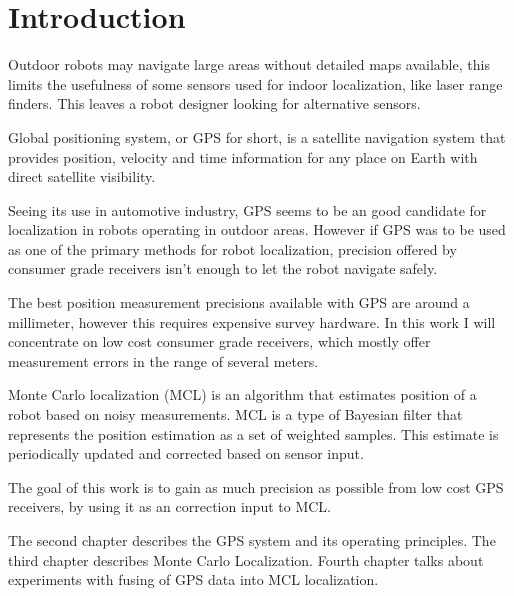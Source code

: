 \chapter{Introduction}


Outdoor robots may navigate large areas without detailed maps available, this limits
the usefulness of some sensors used for indoor localization, like laser range finders.
This leaves a robot designer looking for alternative sensors.




Global positioning system, or GPS for short, is a satellite navigation system that
provides position, velocity and time information for any place on Earth with direct
satellite visibility.

Seeing its use in automotive industry, GPS seems to be an good candidate for
localization in robots operating in outdoor areas.
However if GPS was to be used as one of the primary methods for robot localization,
precision offered by consumer grade receivers isn't enough to let the robot navigate safely.

The best position measurement precisions available with GPS are around a millimeter,
however this requires expensive survey hardware.
In this work I will concentrate on low cost consumer grade receivers, which mostly
offer measurement errors in the range of several meters.




Monte Carlo localization (MCL) is an algorithm that estimates position of a robot
based on noisy measurements.
MCL is a type of Bayesian filter that represents the position estimation as a
set of weighted samples.
This estimate is periodically updated and corrected based on sensor input.




The goal of this work is to gain as much precision as possible from low cost
GPS receivers, by using it as an correction input to MCL.




The second chapter describes the GPS system and its operating principles.
The third chapter describes Monte Carlo Localization.
Fourth chapter talks about experiments with fusing of GPS data into
MCL localization.
